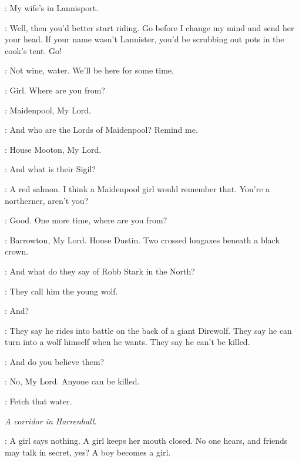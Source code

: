 \REGINALD: My wife's in Lannisport. 

\TYWIN: Well, then you'd better start riding. Go before I change my mind and send her your head. If your name wasn't Lannister, you'd be scrubbing out pots in the cook's tent. Go! 


\TYWIN: Not wine, water. We'll be here for some time. 


\TYWIN: Girl. Where are you from? 

\ARYA: Maidenpool, My Lord. 

\TYWIN: And who are the Lords of Maidenpool? Remind me. 

\ARYA: House Mooton, My Lord. 

\TYWIN: And what is their Sigil? 


\TYWIN: A red salmon. I think a Maidenpool girl would remember that. You're a northerner, aren't you? 


\TYWIN: Good. One more time, where are you from? 

\ARYA: Barrowton, My Lord. House Dustin. Two crossed longaxes beneath a black crown. 

\TYWIN: And what do they say of Robb Stark in the North? 

\ARYA: They call him the young wolf. 

\TYWIN: And? 

\ARYA: They say he rides into battle on the back of a giant Direwolf. They say he can turn into a wolf himself when he wants. They say he can't be killed. 

\TYWIN: And do you believe them? 

\ARYA: No, My Lord. Anyone can be killed. 


\TYWIN: Fetch that water. 



\scene

\textit{A corridor in Harrenhall.} 


\JAQEN: A girl says nothing. A girl keeps her mouth closed. No one hears, and friends may talk in secret, yes? A boy becomes a girl. 

